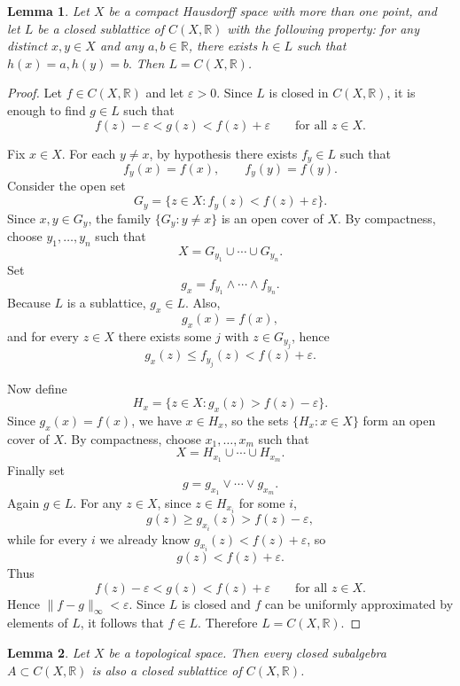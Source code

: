 \documentclass[12pt]{article}
\newtheorem{lemma}{Lemma}
\begin{document}
\begin{lemma}
Let $X$ be a compact Hausdorff space with more than one point, and let $L$ be a closed
sublattice of $C(X,\mathbb{R})$ with the following property: for any distinct $x,y \in X$ and any $a,b \in \mathbb{R}$, there exists $h \in L$ such that $h(x)=a, h(y)=b.$ Then $L=C(X,\mathbb{R})$.
\end{lemma}

\begin{proof}
Let $f \in C(X,\mathbb{R})$ and let $\varepsilon>0$. Since $L$ is closed in
$C(X,\mathbb{R})$, it is enough to find $g \in L$ such that
\[
f(z)-\varepsilon < g(z) < f(z)+\varepsilon \qquad \text{for all } z \in X.
\]

Fix $x \in X$. For each $y \neq x$, by hypothesis there exists $f_y \in L$ such that
\[
f_y(x)=f(x), \qquad f_y(y)=f(y).
\]
Consider the open set
\[
G_y=\{z \in X : f_y(z) < f(z)+\varepsilon\}.
\]
Since $x,y \in G_y$, the family $\{G_y : y \neq x\}$ is an open cover of $X$. By compactness,
choose $y_1,\dots,y_n$ such that
\[
X=G_{y_1}\cup \cdots \cup G_{y_n}.
\]
Set
\[
g_x=f_{y_1}\wedge \cdots \wedge f_{y_n}.
\]
Because $L$ is a sublattice, $g_x \in L$. Also,
\[
g_x(x)=f(x),
\]
and for every $z \in X$ there exists some $j$ with $z \in G_{y_j}$, hence
\[
g_x(z)\le f_{y_j}(z)<f(z)+\varepsilon.
\]

Now define
\[
H_x=\{z \in X : g_x(z)>f(z)-\varepsilon\}.
\]
Since $g_x(x)=f(x)$, we have $x \in H_x$, so the sets $\{H_x : x \in X\}$ form an open
cover of $X$. By compactness, choose $x_1,\dots,x_m$ such that
\[
X=H_{x_1}\cup \cdots \cup H_{x_m}.
\]
Finally set
\[
g=g_{x_1}\vee \cdots \vee g_{x_m}.
\]
Again $g \in L$. For any $z \in X$, since $z \in H_{x_i}$ for some $i$,
\[
g(z)\ge g_{x_i}(z)>f(z)-\varepsilon,
\]
while for every $i$ we already know $g_{x_i}(z)<f(z)+\varepsilon$, so
\[
g(z)<f(z)+\varepsilon.
\]
Thus
\[
f(z)-\varepsilon < g(z) < f(z)+\varepsilon \qquad \text{for all } z \in X.
\]
Hence $\|f-g\|_\infty<\varepsilon$. Since $L$ is closed and $f$ can be uniformly approximated
by elements of $L$, it follows that $f \in L$. Therefore $L=C(X,\mathbb{R})$.
\end{proof}

\begin{lemma}
Let $X$ be a topological space. Then every closed subalgebra $A \subset C(X,\mathbb{R})$
is also a closed sublattice of $C(X,\mathbb{R})$.
\end{lemma}
\end{document}
